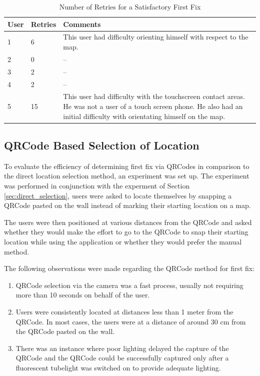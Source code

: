 \begin{table}
\centering
\begin{tabular}{p{0.8in} p{0.8in} p{3.4in}}
\hline
\hline
User     & Retries & Comments \\
\hline
1               & 6                  & This user had difficulty orienting himself with respect to the map. \\
2               & 0                  & -- \\
3               & 2                  & -- \\
4               & 2                  & -- \\
5               & 15                 & This user had difficulty with the touchscreen contact areas. He was not a user of a touch screen phone. He also had an initial difficulty with orientating himself on the map. \\
\hline
\end{tabular}
\caption{Number of Retries for a Satisfactory First Fix\label{tbl:num_loc_attempts}}
\end{table}

\subsection{QRCode Based Selection of Location\label{sec:qrcode_selection}}

To evaluate the efficiency of determining first fix via QRCodes in comparison 
to the direct location selection method, an experiment was set up. 
The experiment was performed in conjunction with the experment of 
Section \ref{sec:direct_selection}, users were asked to locate themselves
by snapping a QRCode pasted on the wall instead of marking their starting 
location on a map.

The users were then positioned at various distances from the QRCode and 
asked whether they would make the effort to go to the QRCode to snap their
starting location while using the application or whether they would prefer
the manual method.

The following observations were made regarding the QRCode method for first
fix:

\begin{enumerate}
\item QRCode selection via the camera was a fast process, usually not requiring
    more than 10 seconds on behalf of the user.
\item Users were consistently located at distances less than 1 meter from 
    the QRCode. In most cases, the users were at a distance of around 30 cm 
    from the QRCode pasted on the wall. 
\item There was an instance where poor lighting delayed the capture of the
    QRCode and the QRCode could be successfully captured only after a 
    fluorescent tubelight was switched on to provide adequate lighting.
\end{enumerate}

